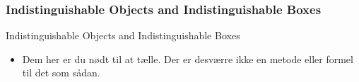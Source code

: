 \documentclass{beamer}
\begin{document}
\subsubsection{Indistinguishable Objects and Indistinguishable Boxes}

\begin{frame}{Indistinguishable Objects and Indistinguishable Boxes}
    \begin{itemize}
        \item Dem her er du nødt til at tælle. Der er desværre ikke en metode eller formel til det som sådan.
    \end{itemize}
\end{frame}
\end{document}
